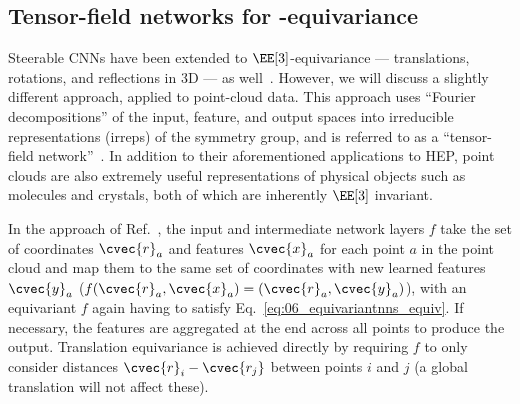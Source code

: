 \subsection{Tensor-field networks for \texorpdfstring{\EE[3]}{E(3)}-equivariance}
\label{sec:06_equivariantnns_e3}

Steerable CNNs have been extended to $\EE[3]$-equivariance --- translations, rotations, and reflections in 3D --- as well~\cite{weiler20183d}.
However, we will discuss a slightly different approach, applied to point-cloud data.
This approach uses ``Fourier decompositions'' of the input, feature, and output spaces into irreducible representations (irreps) of the symmetry group, and is referred to as a ``tensor-field network''~\cite{thomas2018tensor}.
In addition to their aforementioned applications to HEP, point clouds are also extremely useful representations of physical objects such as molecules and crystals, both of which are inherently $\EE[3]$ invariant.

In the approach of Ref.~\cite{thomas2018tensor}, the input and intermediate network layers $f$ take the set of coordinates $\cvec{r}_a$ and features $\cvec{x}_a$ for each point $a$ in the point cloud and map them to the same set of coordinates with new learned features $\cvec{y}_a$ ($f(\cvec{r}_a,\cvec{x}_a) = (\cvec{r}_a,\cvec{y}_a)$), with an equivariant $f$ again having to satisfy Eq.~\ref{eq:06_equivariantnns_equiv}.
If necessary, the features are aggregated at the end across all points to produce the output.
Translation equivariance is achieved directly by requiring $f$ to only consider distances $\cvec{r}_i - \cvec{r_j}$ between points $i$ and $j$ (a global translation will not affect these).

